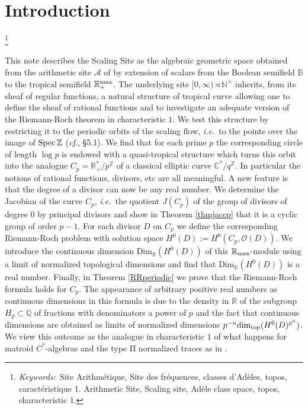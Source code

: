 \documentclass{elsart3-1}
\def\Spec{{\rm Spec\,}}
\def\B{{\mathbb B}}
\def\C{{\mathbb C}}
\def\N{{\mathbb N}}
\def\Q{{\mathbb Q}}
\def\R{{\mathbb R}}
\def\Z{{\mathbb Z}}
\def\aarith{{\mathscr A}}
\def\cdim{{{\mbox{Dim}_\R}}}
\def\tdim{{{\mbox{dim}_{\rm top}}}}
\def\cO{{\mathcal O}}
\newcommand{\ie}{{\it i.e.\/}\ }
\newcommand{\cf}{{\it cf.}}
\def\rmax{\R_+^{\rm max}}
\def\rma{\R_{\rm max}}
\def\rnt{{[0,\infty)\rtimes{\N^{\times}}}}
\newcommand\blfootnote[1]{%
  \begingroup
  \renewcommand\thefootnote{}\footnote{#1}%
  \addtocounter{footnote}{-1}%
  \endgroup
}
\begin{document}

\vspace*{-1.4cm}
\section{Introduction}
\label{}
\blfootnote{{\it Keywords:}~Site Arithm\'etique, Site des fr\'equences, classes d'Ad\`eles, topos,  caract\'eristique 1.
Arithmetic Site, Scaling site, Ad\`ele class space, topos, characteristic 1.}

\vspace*{-.7cm}


This note describes the Scaling Site as the algebraic geometric space  obtained from the arithmetic site $\aarith$ of \cite{CC,CC1} by extension of scalars from the Boolean semifield $\B$ to the tropical semifield $\rmax$. The underlying  site $\rnt$ inherits, from its sheaf of regular functions, a natural structure of tropical curve allowing one to define the sheaf of rational functions and to   investigate an adequate version of the Riemann-Roch theorem in characteristic $1$. We test this structure by restricting it to the periodic orbits of the scaling flow, \ie to the points over the image of $\Spec\Z$ (\cf\cite{CC1}, \S 5.1). We find that for each prime $p$ the corresponding circle of length $\log p$ is endowed with a quasi-tropical structure which turns this orbit into the analogue $C_p=\R_+^*/p^\Z$ of a classical elliptic curve $\C^*/q^\Z$. In particular the notions of rational functions, divisors, etc are all meaningful. A new feature is that the degree of a divisor can now be any real number. We determine the Jacobian of  the curve $C_p$, \ie the quotient $J(C_p)$  of the group of divisors of degree $0$ by principal divisors and show  in Theorem \ref{thmjaccp}  that it is a cyclic group of order $p-1$. For each divisor $D$ on $C_p$ we define the corresponding Riemann-Roch problem with solution space $H^0(D):=H^0(C_p,\cO(D))$. We introduce the continuous dimension $\cdim(H^0(D))$ of this $\rma$-module using a limit of normalized topological dimensions and find that $\cdim(H^0(D))$ is a real number. Finally, in Theorem \ref{RRperiodic} we prove  that the  Riemann-Roch formula holds for $C_p$. The appearance of arbitrary positive real numbers as continuous dimensions in this formula is due to the density in $\R$ of the subgroup $H_p\subset \Q$ of fractions with denominators a power of $p$ and the fact that continuous dimensions are obtained as limits of normalized dimensions $p^{-n}\tdim(H^0(D)^{p^n})$. We view this outcome  as the analogue in characteristic $1$ of what happens for matroid  $C^*$-algebras and the type II normalized traces as in \cite{dix}.
\end{document}
